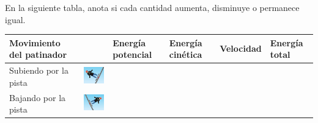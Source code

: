 \question[10] En la siguiente tabla, anota si cada cantidad aumenta, disminuye o permanece igual.

\begin{table}[H]
    \centering
    \begin{tabular}{|l|l|l|l|l|l|}
        \hline
        Movimiento del patinador &                                               & Energía potencial & Energía cinética & Velocidad & Energía total \\
        \hline
        Subiendo por la pista    & \includegraphics[width=100pt]{../images/up}   &                   &                  &           &               \\
        \hline
        Bajando por la pista     & \includegraphics[width=100pt]{../images/down} &                   &                  &           &               \\
        \hline
    \end{tabular}
    \label{tab:upordown}
\end{table}